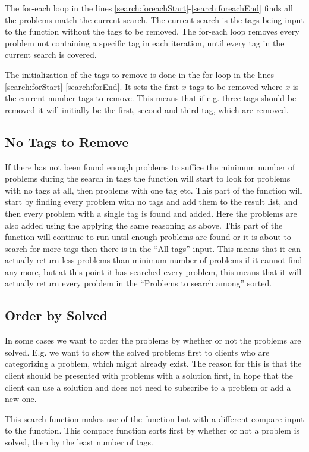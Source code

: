 The for-each loop in the lines \ref{search:foreachStart}-\ref{search:foreachEnd} finds all the problems match the current search.
The current search is the tags being input to the function without the tags to be removed.
The for-each loop removes every problem not containing a specific tag in each iteration, until every tag in the current search is covered.

The initialization of the tags to remove is done in the for loop in the lines \ref{search:forStart}-\ref{search:forEnd}.
It sets the first $x$ tags to be removed where $x$ is the current number tags to remove.
This means that if e.g. three tags should be removed it will initially be the first, second and third tag, which are removed.

\subsection{No Tags to Remove}
\label{sub:noTags}
If there has not been found enough problems to suffice the minimum number of problems during the search in tags the function will start to look for problems with no tags at all, then problems with one tag etc.
This part of the function will start by finding every problem with no tags and add them to the result list, and then every problem with a single tag is found and added.
Here the problems are also added using the  applying the same reasoning as above.
This part of the function will continue to run until enough problems are found or it is about to search for more tags then there is in the ``All tags'' input.
This means that it can actually return less problems than minimum number of problems if it cannot find any more, but at this point it has searched every problem, this means that it will actually return every problem in the ``Problems to search among'' sorted.

\subsection{Order by Solved}
\label{sub:orderSolved}
In some cases we want to order the problems by whether or not the problems are solved.
E.g. we want to show the solved problems first to clients who are categorizing a problem, which might already exist.
The reason for this is that the client should be presented with problems with a solution first, in hope that the client can use a solution and does not need to subscribe to a problem or add a new one.

This search function makes use of the  function but with a different compare input to the  function.
This compare function sorts first by whether or not a problem is solved, then by the least number of tags.